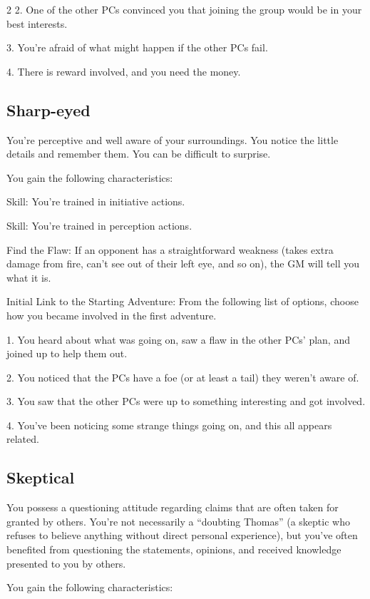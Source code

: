 \begin{multicols}{2}
2. One of the other PCs convinced you that joining the group would be in your best interests.

3. You’re afraid of what might happen if the other PCs fail.

4. There is reward involved, and you need the money.

\subsection{Sharp-eyed}

You’re perceptive and well aware of your surroundings. You notice the little details and remember them. You can be difficult to surprise.

You gain the following characteristics:

Skill: You’re trained in initiative actions.

Skill: You’re trained in perception actions.

Find the Flaw: If an opponent has a straightforward weakness (takes extra damage from fire, can’t see out of their left eye, and so on), the GM will tell you what it is.

Initial Link to the Starting Adventure: From the following list of options, choose how you became involved in the first adventure.

1. You heard about what was going on, saw a flaw in the other PCs’ plan, and joined up to help them out.

2. You noticed that the PCs have a foe (or at least a tail) they weren’t aware of.

3. You saw that the other PCs were up to something interesting and got involved.

4. You’ve been noticing some strange things going on, and this all appears related.

\subsection{Skeptical}

You possess a questioning attitude regarding claims that are often taken for granted by others. You’re not necessarily a “doubting Thomas” (a skeptic who refuses to believe anything without direct personal experience), but you’ve often benefited from questioning the statements, opinions, and received knowledge presented to you by others.

You gain the following characteristics:


\end{multicols}
